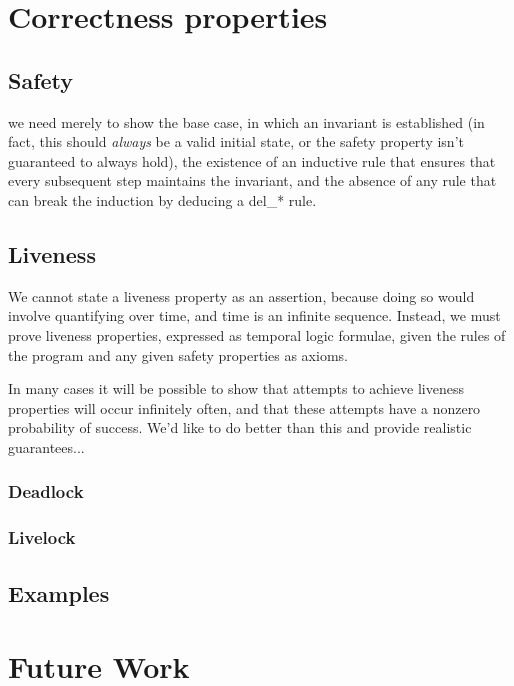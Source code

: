 \documentclass{acm_proc_article-sp-sigmod09}
\begin{document}
\section{Correctness properties}

\subsection{Safety}

we need merely to show the base case, in which an invariant is established (in fact, this should \emph{always} be a valid 
initial state, or the safety property isn't guaranteed to always hold), the existence of an inductive rule that ensures that every 
subsequent step maintains the invariant, and the absence of any rule that can break the induction by deducing a del\_* rule.

\subsection{Liveness}

We cannot state a liveness property as an assertion, because doing so would involve quantifying over time,
and time is an infinite sequence.  Instead, we must prove liveness properties, expressed as temporal logic
formulae, given the rules of the program and any given safety properties as axioms.

In many cases it will be possible to show that attempts to achieve liveness properties will occur infinitely often, and that
these attempts have a nonzero probability of success.  We'd like to do better than this and provide realistic guarantees...

\subsubsection{Deadlock}



\subsubsection{Livelock}

\subsection{Examples}

\section{Future Work}


\end{document}
